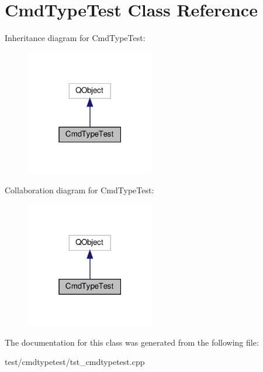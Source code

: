\hypertarget{classCmdTypeTest}{}\section{Cmd\+Type\+Test Class Reference}
\label{classCmdTypeTest}


Inheritance diagram for Cmd\+Type\+Test\+:
\nopagebreak
\begin{figure}[H]
\begin{center}
\leavevmode
\includegraphics[width=159pt]{classCmdTypeTest__inherit__graph}
\end{center}
\end{figure}


Collaboration diagram for Cmd\+Type\+Test\+:
\nopagebreak
\begin{figure}[H]
\begin{center}
\leavevmode
\includegraphics[width=159pt]{classCmdTypeTest__coll__graph}
\end{center}
\end{figure}


The documentation for this class was generated from the following file\+:\begin{DoxyCompactItemize}
\item 
test/cmdtypetest/tst\+\_\+cmdtypetest.\+cpp\end{DoxyCompactItemize}
